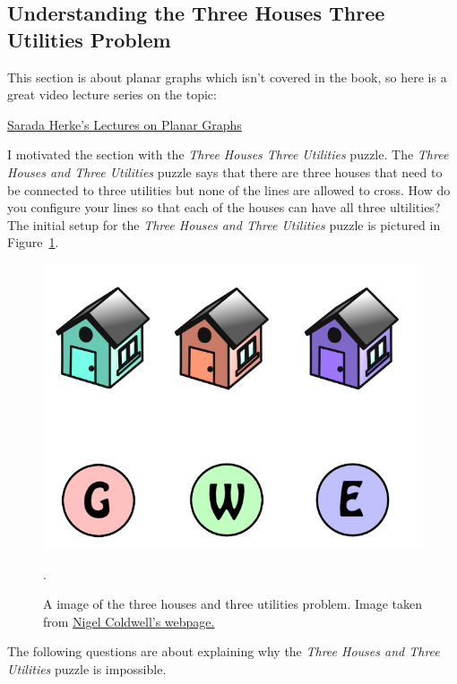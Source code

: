 \documentclass[11pt, letterpaper]{article}
\begin{document}
\subsection{Understanding the Three Houses Three Utilities Problem}
This section is about planar graphs which isn't covered in the book, so here is a great video lecture series on the topic:
\begin{center}
	\href{https://www.youtube.com/playlist?list=PLGxuz-nmYlQPgIHbqWtgD-F7NnJuqs4fH}{Sarada Herke's Lectures on Planar Graphs}
\end{center}

I motivated the section with the \emph{Three Houses Three Utilities} puzzle.
The \emph{Three Houses and Three Utilities} puzzle says that there are three houses that need to be connected to three utilities but none of the lines are allowed to cross. How do you configure your lines so that each of the houses can have all three ultilities? The initial setup for the \emph{Three Houses and Three Utilities} puzzle is pictured in Figure~\ref{F:three-houses}.
\begin{figure}[h]
	\begin{center}
		\includegraphics[scale=0.25]{three-houses.png}
	\end{center}
	\caption{A image of the three houses and three utilities problem.  Image taken from \href{http://puzzles.nigelcoldwell.co.uk/twentysix.htm}{Nigel Coldwell's webpage.} }\label{F:three-houses}.
\end{figure}
The following questions are about explaining why the \emph{Three Houses and Three Utilities} puzzle is impossible. 
\end{document}
